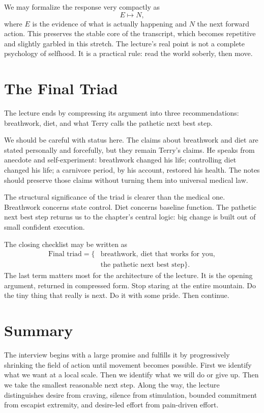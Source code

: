 We may formalize the response very compactly as
\begin{equation}
E \longmapsto N,
\end{equation}
where \(E\) is the evidence of what is actually happening and \(N\) the next forward action. This preserves the stable core of the transcript, which becomes repetitive and slightly garbled in this stretch. The lecture's real point is not a complete psychology of selfhood. It is a practical rule: read the world soberly, then move.

\section{The Final Triad}

The lecture ends by compressing its argument into three recommendations: breathwork, diet, and what Terry calls the pathetic next best step.

We should be careful with status here. The claims about breathwork and diet are stated personally and forcefully, but they remain Terry's claims. He speaks from anecdote and self-experiment: breathwork changed his life; controlling diet changed his life; a carnivore period, by his account, restored his health. The notes should preserve those claims without turning them into universal medical law.

The structural significance of the triad is clearer than the medical one. Breathwork concerns state control. Diet concerns baseline function. The pathetic next best step returns us to the chapter's central logic: big change is built out of small confident execution.

The closing checklist may be written as
\begin{align}
\text{Final triad} = \{&\text{breathwork},\ \text{diet that works for you},\\
&\text{the pathetic next best step}\}.
\end{align}
The last term matters most for the architecture of the lecture. It is the opening argument, returned in compressed form. Stop staring at the entire mountain. Do the tiny thing that really is next. Do it with some pride. Then continue.

\section{Summary}

The interview begins with a large promise and fulfills it by progressively shrinking the field of action until movement becomes possible. First we identify what we want at a local scale. Then we identify what we will do or give up. Then we take the smallest reasonable next step. Along the way, the lecture distinguishes desire from craving, silence from stimulation, bounded commitment from escapist extremity, and desire-led effort from pain-driven effort.


